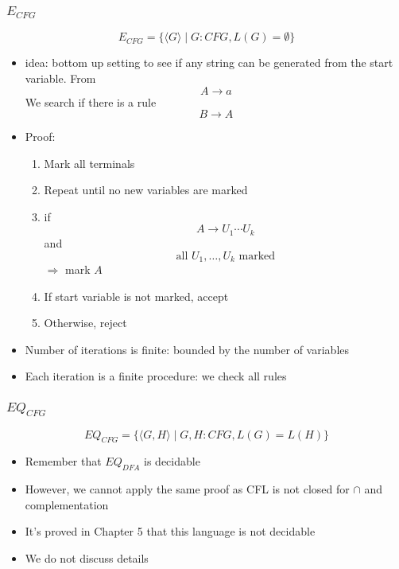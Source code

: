 \begin{frame}[allowframebreaks] \frametitle{$E_{CFG}$}
\begin{equation*}
  E_{CFG}
=\{\langle  G\rangle \mid
G: CFG, L(G)=\emptyset\}
\end{equation*}
  \begin{itemize}
  \item idea: bottom up setting to see if any string can be generated
    from the start variable. From
  \begin{equation*}
    A\rightarrow a
  \end{equation*}
  We search if there is a rule
\begin{equation*}
  B\rightarrow A
\end{equation*}

\item Proof:
  \begin{enumerate}
  \item Mark all terminals
  \item Repeat until no new variables are marked

  \item [] \quad if
    \begin{equation*}
    A\rightarrow U_1\cdots U_k
  \end{equation*}
   \quad and 
   \begin{equation*}
\text{all }    U_1, \ldots, U_k \text{ marked}
 \end{equation*}
\quad $\Rightarrow$  mark $A$
\item If start variable is not marked, accept
\item [] Otherwise, reject
  \end{enumerate}
\item Number of iterations is finite: bounded by the number of
  variables
\item Each iteration is a finite procedure: we check all rules
\end{itemize}\end{frame} \begin{frame}[allowframebreaks] \frametitle{$EQ_{CFG}$}
\begin{equation*}
  EQ_{CFG}
=\{\langle  G,H\rangle \mid G,H: CFG, L(G)=
L(H)\}
\end{equation*}
  \begin{itemize}
\item Remember that $EQ_{DFA}$ is decidable
\item However, we cannot apply the same proof as
 CFL is not closed for 
$\cap$ and complementation
\item It's proved in Chapter 5 that this language is not decidable
\item We do not discuss details
\end{itemize}\end{frame}

